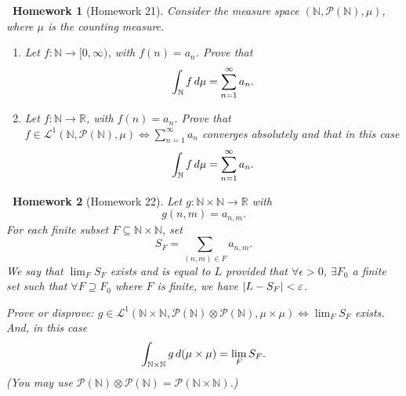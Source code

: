 \documentclass[notoc,notitlepage]{tufte-book}
\newtheorem*{homework}{\faCogs\ Homework}
\begin{document}
\begin{homework}[Homework 21]\label{homework:21}
  Consider the measure space $(\mathbb{N}, \mathcal{P}(\mathbb{N}), \mu)$,
  where $\mu$ is the counting measure.
  \begin{enumerate}
    \item Let $f : \mathbb{N} \to [0, \infty)$, with $f(n) = a_n$.
      Prove that
      \begin{equation*}
        \int_{\mathbb{N}} f \mathop{}\!d{\mu} = \sum_{n=1}^{\infty} a_n.
      \end{equation*}
    \item Let $f : \mathbb{N} \to \mathbb{R}$, with $f(n) = a_n$.
      Prove that
      $f \in \mathcal{L}^1(\mathbb{N}, \mathcal{P}(\mathbb{N}), \mu)
      \iff \sum_{n=1}^{\infty} a_n$ converges absolutely
      and that in this case
      \begin{equation*}
        \int_{\mathbb{N}} f \mathop{}\!d{\mu} = \sum_{n=1}^{\infty} a_n.
      \end{equation*}
  \end{enumerate}
\end{homework}

\begin{homework}[Homework 22]\label{homework:22}
  Let $g : \mathbb{N} \times \mathbb{N} \to \mathbb{R}$ with
  \begin{equation*}
    g(n, m) = a_{n, m}.
  \end{equation*}
  For each finite subset $F \subseteq \mathbb{N} \times \mathbb{N}$,
  set
  \begin{equation*}
    S_F = \sum_{(n, m) \in F} a_{n, m}.
  \end{equation*}
  We say that $\lim_{F} S_F$ exists and is equal to $L$
  provided that $\forall \epsilon > 0$, $\exists F_0$ a finite set
  such that $\forall F \supseteq F_0$ where $F$ is finite,
  we have $\left|L - S_F\right| < \varepsilon$.

  Prove or disprove:
  $g \in \mathcal{L}^1(\mathbb{N} \times \mathbb{N},
  \mathcal{P}(\mathbb{N}) \otimes \mathcal{P}(\mathbb{N}), \mu \times \mu)
  \iff \lim_{F} S_F$ exists.
  And, in this case
  \begin{equation*}
    \int_{\mathbb{N} \times \mathbb{N}} g \mathop{}\!d{(\mu \times \mu)}
    = \lim_{F} S_F.
  \end{equation*}
  (You may use $\mathcal{P}(\mathbb{N}) \otimes \mathcal{P}(\mathbb{N})
  = \mathcal{P}(\mathbb{N} \times \mathbb{N})$.)
\end{homework}
\end{document}
